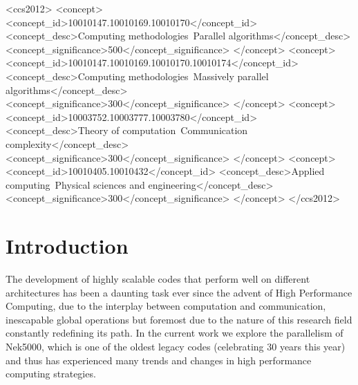 \documentclass{sig-alternate}
\begin{document}
%
 \begin{CCSXML}
<ccs2012>
<concept>
<concept_id>10010147.10010169.10010170</concept_id>
<concept_desc>Computing methodologies~Parallel algorithms</concept_desc>
<concept_significance>500</concept_significance>
</concept>
<concept>
<concept_id>10010147.10010169.10010170.10010174</concept_id>
<concept_desc>Computing methodologies~Massively parallel algorithms</concept_desc>
<concept_significance>300</concept_significance>
</concept>
<concept>
<concept_id>10003752.10003777.10003780</concept_id>
<concept_desc>Theory of computation~Communication complexity</concept_desc>
<concept_significance>300</concept_significance>
</concept>
<concept>
<concept_id>10010405.10010432</concept_id>
<concept_desc>Applied computing~Physical sciences and engineering</concept_desc>
<concept_significance>300</concept_significance>
</concept>
</ccs2012>
\end{CCSXML}



%
%

%
%
\printccsdesc



\section{Introduction}
The development of highly scalable codes that perform well on different
architectures has been a daunting task ever since the advent of High Performance
Computing, due to the interplay between computation and communication,
inescapable global operations but foremost due to the nature of this research
field constantly redefining its path. In the current work we explore the parallelism of Nek5000, which is one of the oldest legacy codes (celebrating 30 years this year) and thus has experienced many trends and changes in high performance computing strategies.
\end{document}
